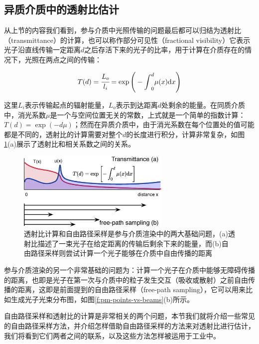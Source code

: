 \subsection{异质介质中的透射比估计}\label{sec:pm-transmittance-estimate}
从上节的内容我们看到，参与介质中光照传输的问题最后都可以归结为透射比（transmittance）的计算，也可以称作部分可见性（fractional visibility）它表示光子沿直线传输一定距离$d$之后存活下来的光子的比率，用于计算在介质存在的情况下，光照在两点之间的传输：

\begin{equation}
	T(d)= \cfrac{L_o}{l_i}=\exp{\Bigg(-{\rm \int}^{d}_0}\mu(x){\rm d}x\Bigg)
\end{equation}

这里$L_i$表示传输起点的辐射能量，$L_o$表示到达距离$d$处剩余的能量。在同质介质中，消光系数$\mu$是一个与空间位置无关的常数，上式就是一个简单的指数计算：$T(d)=\exp(-d\mu)$；然而在异质介质中，由于消光系数在每个位置处的值可能都是不同的，透射比的计算需要对整个$d$的长度进行积分，计算非常复杂，如图\ref{f:pm-transmittance-vs-fps}(a)展示了透射比和相关系数之间的关系。

\begin{figure}
	\sidecaption
	\includegraphics[width=0.65\textwidth]{figures/pm/transmittance-1}
	\caption{透射比计算和自由路径采样是参与介质渲染中的两大基础问题，(a)透射比描述了一束光子在给定距离的传输后剩余下来的能量，而(b)自由路径采样则尝试计算一个光子能够在介质中自由传播的距离}
	\label{f:pm-transmittance-vs-fps}
\end{figure}

参与介质渲染的另一个非常基础的问题为：计算一个光子在介质中能够无障碍传播的距离，也即是光子在第一次与介质中的粒子发生交互（吸收或散射）之前自由传播的距离，这即是前面提到的自由路径采样（free-path sampling），它可以用来比如生成光子光束分布图，如图\ref{f:pm-points-vs-beams}(b)所示。

自由路径采样和透射比的计算是非常相关的两个问题，本节我们就将介绍一些常见的自由路径采样方法，并介绍怎样借助自由路径采样的方法来对透射比进行估计，我们将看到它们两者之间的联系，以及这些方法怎样被运用于工业中。




